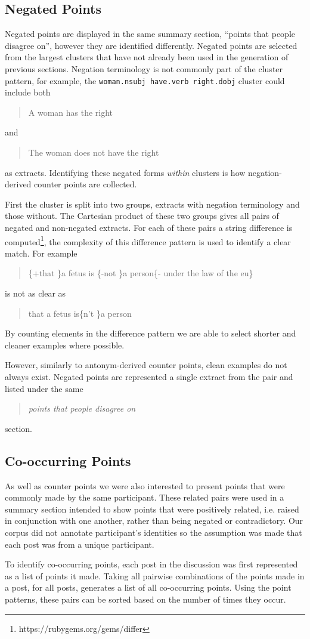     \subsection{Negated Points \label{neg-points}}
      Negated points are displayed in the same summary section, ``points that people disagree on'', however they are identified differently. Negated points are selected from the largest clusters that have not already been used in the generation of previous sections. Negation terminology is not commonly part of the cluster pattern, for example, the \texttt{woman.nsubj have.verb right.dobj} cluster could include both \blockquote{A woman has the right} and \blockquote{The woman does not have the right} as extracts. Identifying these negated forms \textit{within} clusters is how negation-derived counter points are collected.

      First the cluster is split into two groups, extracts with negation terminology and those without. The Cartesian product of these two groups gives all pairs of negated and non-negated extracts. For each of these pairs a string difference is computed\footnote{https://rubygems.org/gems/differ}, the complexity of this difference pattern is used to identify a clear match. For example \blockquote{\{+that \}a fetus is \{-not \}a person\{- under the law of the eu\}} is not as clear as \blockquote{that a fetus is\{n't \}a person}. By counting elements in the difference pattern we are able to select shorter and cleaner examples where possible.

      However, similarly to antonym-derived counter points, clean examples do not always exist. Negated points are represented a single extract from the pair and listed under the same \blockquote{\textit{points that people disagree on}} section.

    \subsection{Co-occurring Points}
      As well as counter points we were also interested to present points that were commonly made by the same participant. These related pairs were used in a summary section intended to show points that were positively related, i.e. raised in conjunction with one another, rather than being negated or contradictory. Our corpus did not annotate participant's identities so the assumption was made that each post was from a unique participant.

      To identify co-occurring points, each post in the discussion was first represented as a list of points it made. Taking all pairwise combinations of the points made in a post, for all posts, generates a list of all co-occurring points. Using the point patterns, these pairs can be sorted based on the number of times they occur.

